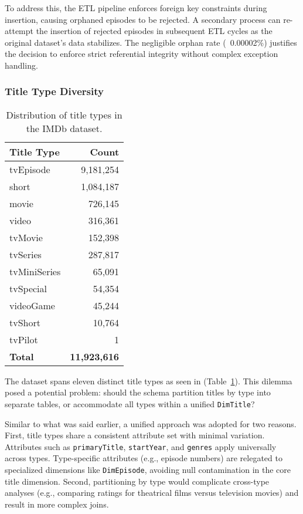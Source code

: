 To address this, the ETL pipeline enforces foreign key constraints during insertion, causing orphaned episodes to be rejected. A secondary process can re-attempt the insertion of rejected episodes in subsequent ETL cycles as the original dataset's data stabilizes. The negligible orphan rate (~0.00002\%) justifies the decision to enforce strict referential integrity without complex exception handling.

\subsubsection{Title Type Diversity}

\begin{table}[h]
  \centering
  \caption{Distribution of title types in the IMDb dataset.}
  \label{tab:title-types}
  \begin{tabular}{lr}
    \toprule
    \textbf{Title Type} & \textbf{Count} \\
    \midrule
    tvEpisode       & 9,181,254 \\
    short           & 1,084,187 \\
    movie           & 726,145   \\
    video           & 316,361   \\
    tvMovie         & 152,398   \\
    tvSeries        & 287,817   \\
    tvMiniSeries    & 65,091    \\
    tvSpecial       & 54,354    \\
    videoGame       & 45,244    \\
    tvShort         & 10,764    \\
    tvPilot         & 1         \\
    \midrule
    \textbf{Total}  & \textbf{11,923,616} \\
    \bottomrule
  \end{tabular}
\end{table}

The dataset spans eleven distinct title types as seen in (Table~\ref{tab:title-types}). This dilemma posed a potential problem: should the schema partition titles by type into separate tables, or accommodate all types within a unified \texttt{DimTitle}?

Similar to what was said earlier, a unified approach was adopted for two reasons. First, title types share a consistent attribute set with minimal variation. Attributes such as \texttt{primaryTitle}, \texttt{startYear}, and \texttt{genres} apply universally across types. Type-specific attributes (e.g., episode numbers) are relegated to specialized dimensions like \texttt{DimEpisode}, avoiding null contamination in the core title dimension. Second, partitioning by type would complicate cross-type analyses (e.g., comparing ratings for theatrical films versus television movies) and result in more complex joins.


